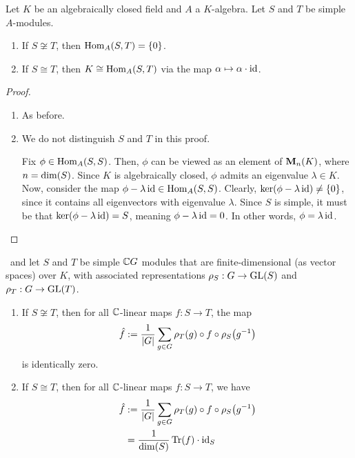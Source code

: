 \begin{theorem}
    Let $K$ be an algebraically closed field and $A$ a $K$-algebra. Let $S$ and $T$ be simple $A$-modules.
    \begin{enumerate}[label = \normalfont \arabic*., noitemsep]
        \item If $S \not\cong T$, then $\operatorname{Hom}_A(S, T) = \left\{ 0 \right\}$.
        \item If $S \cong T$, then $K \cong \operatorname{Hom}_A(S, T)$ via the map $\alpha \mapsto \alpha \cdot \operatorname{id}$.
    \end{enumerate}
\end{theorem}
\begin{proof}
    \hfill
    \begin{enumerate}
        \item As before.
        \item We do not distinguish $S$ and $T$ in this proof.
        
        Fix $\phi \in \operatorname{Hom}_A(S,S)$. Then, $\phi$ can be viewed as an element of $\mathbf{M}_{n}\!\left( K \right)$, where $n = \dim\!\left( S \right)$. Since $K$ is algebraically closed, $\phi$ admits an eigenvalue $\lambda \in K$. Now, consider the map $\phi - \lambda \operatorname{id} \in \operatorname{Hom}_A(S,S)$. Clearly, $\operatorname{ker}\!\left( \phi - \lambda \operatorname{id} \right) \neq \left\{ 0 \right\}$, since it contains all eigenvectors with eigenvalue $\lambda$. Since $S$ is simple, it must be that $\operatorname{ker}\!\left( \phi - \lambda \operatorname{id} \right) = S$, meaning $\phi - \lambda \operatorname{id} = 0$. In other words, $\phi = \lambda \operatorname{id}$.  %
    \end{enumerate}
\end{proof}

\begin{boxtheorem}
    \ and let $S$ and $T$ be simple $\mathbb{C} G$ modules that are finite-dimensional (as vector spaces) over $K$, with associated representations $\rho_S : G \to \operatorname{GL}\!\left( S \right)$ and $\rho_T : G \to \operatorname{GL}\!\left( T \right)$.
    \begin{enumerate}[label = \normalfont \arabic*.]
        \item If $S \not\cong T$, then for all $\mathbb{C}$-linear maps $f : S \to T$, the map
        \begin{align*}
            \hat{f} := \frac{1}{\left\lvert G \right\rvert} \sum_{g \in G} \rho_T(g) \circ f \circ \rho_S\!\left( g^{-1} \right)
        \end{align*}
        is identically zero.

        \item If $S \cong T$, then for all $\mathbb{C}$-linear maps $f : S \to T$, we have
        \begin{align*}
            \hat{f} &:= \frac{1}{\left\lvert G \right\rvert} \sum_{g \in G} \rho_T(g) \circ f \circ \rho_S\!\left( g^{-1} \right) \\
            &= \frac{1}{\dim\!\left( S \right)} \operatorname{Tr}\!\left( f \right) \cdot \operatorname{id}_S
        \end{align*}
    \end{enumerate}
\end{boxtheorem}

